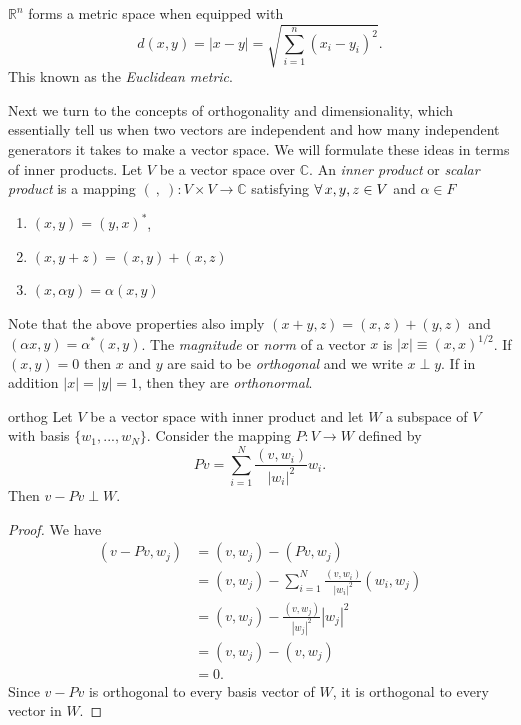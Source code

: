 \begin{example*}{}{}
 $\mathbb{R}^n$ forms a metric space when equipped with
  \begin{equation}
    d(x,y)=|x-y|=\sqrt{\sum\limits_{i=1}^n(x_i-y_i)^2}.
  \end{equation}
  This known as the {\it Euclidean metric}.
\end{example*}

Next we turn to the concepts of orthogonality and dimensionality, which
essentially tell us when two vectors are independent and how many independent
generators it takes to make a vector space.
We will formulate these ideas in terms of inner products.
  Let $V$ be a vector space over $\mathbb{C}$. An {\it inner
  product} or {\it scalar product} is a mapping
  $(\ ,\ ):V\times V\to \mathbb{C}$
  satisfying $\operatorname{\forall} x,y,z\in V$ and $\alpha \in F$
  \begin{enumerate}
    \item $(x,y)=(y,x)^{*}$,
    \item $(x,y+z)=(x,y)+(x,z)$
    \item $(x,\alpha y)=\alpha(x,y)$
  \end{enumerate}
  Note that the above properties also imply $(x+y,z)=(x,z)+(y,z)$ and
  $(\alpha x,y)=\alpha^{*}(x,y)$. The {\it magnitude} or {\it norm}
  of a vector $x$ is $|x|\equiv(x,x)^{1/2}$. If $(x,y)=0$ then $x$
  and $y$ are said to be {\it orthogonal} and we write $x\perp y$.
  If in addition $|x|=|y|=1$, then they are {\it orthonormal}.

\begin{proposition}{}{orthog}
  Let $V$ be a vector space with inner product and let $W$ a subspace
  of $V$ with basis $\{w_1,...,w_N\}$. Consider the mapping $P:V\to W$
  defined by
  $$
    Pv=\sum_{i=1}^N\frac{(v,w_i)}{|w_i|^2}w_i.
  $$
  Then $v-Pv\perp W.$
  \begin{proof}
    We have
    \begin{equation*}
      \begin{aligned}
        (v-Pv,w_j)&=(v,w_j)-(Pv,w_j)\\
          &=(v,w_j)-\sum_{i=1}^N\frac{(v,w_i)}{|w_i|^2}(w_i,w_j)\\
          &=(v,w_j)-\frac{(v,w_j)}{|w_j|^2}|w_j|^2\\
          &=(v,w_j)-(v,w_j)\\
          &=0.
      \end{aligned}
    \end{equation*}
    Since $v-Pv$ is orthogonal to every basis vector of $W$, it is
    orthogonal to every vector in $W$.
  \end{proof}
\end{proposition}

